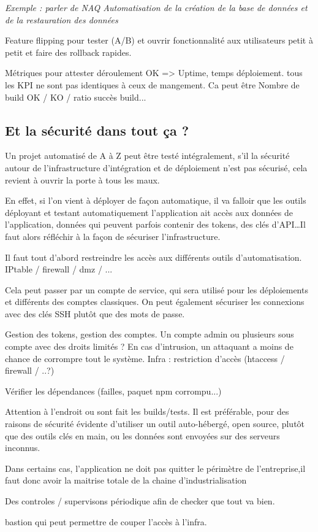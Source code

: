 \textit{Exemple : parler de NAQ Automatisation de la création de la base de données et de la restauration des données}

Feature flipping pour tester (A/B) et ouvrir fonctionnalité aux utilisateurs petit à petit et faire des rollback rapides.

Métriques pour attester déroulement OK => Uptime, temps déploiement. tous les KPI ne sont pas identiques à ceux de mangement. Ca peut être Nombre de build OK / KO / ratio succès build...

\subsection{Et la sécurité dans tout ça ?}

Un projet automatisé de A à Z peut être testé intégralement, s'il la sécurité autour de l'infrastructure d'intégration et de déploiement n'est pas sécurisé, cela revient à ouvrir la porte à tous les maux. 

En effet, si l'on vient à déployer de façon automatique, il va falloir que les outils déployant et testant automatiquement l'application ait accès aux données de l'application, données qui peuvent parfois contenir des tokens, des clés d'\gls{API}\ldots Il faut alors réfléchir à la façon de sécuriser l'infrastructure. 

Il faut tout d'abord restreindre les accès aux différents outils d'automatisation. IPtable / firewall / dmz / ...

Cela peut passer par un compte de service, qui sera utilisé pour les déploiements et différents des comptes classiques. On peut également sécuriser les connexions avec des clés \gls{SSH} plutôt que des mots de passe. 


Gestion des tokens, gestion des comptes.
Un compte admin ou plusieurs sous compte avec des droits limités ? En cas d'intrusion, un attaquant a moins de chance de corrompre tout le système.
Infra : restriction d'accès (htaccess / firewall / ..?)

Vérifier les dépendances (failles, paquet npm corrompu...)

Attention à l'endroit ou sont fait les builds/tests. Il est préférable, pour des raisons de sécurité évidente d'utiliser un outil auto-hébergé, open source, plutôt que des outils clés en main, ou les données sont envoyées sur des serveurs inconnus. 

Dans certains cas, l'application ne doit pas quitter le périmètre de l'entreprise,il faut donc avoir la maitrise totale de la chaine d'industrialisation

Des controles / supervisons périodique afin de checker que tout va bien.

bastion qui peut permettre de couper l'accès à l'infra.
